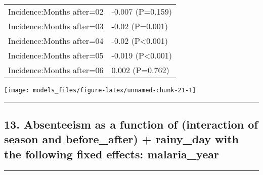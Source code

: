 \documentclass[]{article}
\begin{document}
\begin{longtable}[t]{ll}
\hspace{1em}Incidence:Months after=02 & -0.007 (P=0.159)\\
\hspace{1em}Incidence:Months after=03 & -0.02 (P=0.001)\\
\hspace{1em}Incidence:Months after=04 & -0.02 (P<0.001)\\
\hspace{1em}Incidence:Months after=05 & -0.019 (P<0.001)\\
\hspace{1em}Incidence:Months after=06 & 0.002 (P=0.762)\\*
\end{longtable}

\begin{center}\texttt{[image: models\_files/figure-latex/unnamed-chunk-21-1]} \end{center}

\newpage

\begin{center}\rule{0.5\linewidth}{\linethickness}\end{center}

\subsection{13. Absenteeism as a function of (interaction of season and
before\_after) + rainy\_day with the following fixed effects:
malaria\_year}\label{absenteeism-as-a-function-of-interaction-of-season-and-before_after-rainy_day-with-the-following-fixed-effects-malaria_year}

\begin{center}\rule{0.5\linewidth}{\linethickness}\end{center}
\end{document}
